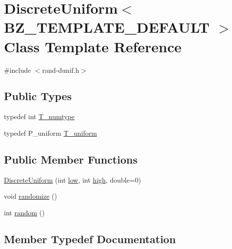 \hypertarget{classDiscreteUniform}{}\section{Discrete\+Uniform$<$ B\+Z\+\_\+\+T\+E\+M\+P\+L\+A\+T\+E\+\_\+\+D\+E\+F\+A\+U\+L\+T $>$ Class Template Reference}
\label{classDiscreteUniform}


{\ttfamily \#include $<$rand-\/dunif.\+h$>$}

\subsection*{Public Types}
\begin{DoxyCompactItemize}
\item 
typedef int \hyperlink{classDiscreteUniform_aaffd818479c69c4d6f9fa047b85481a4}{T\+\_\+numtype}
\item 
typedef P\+\_\+uniform \hyperlink{classDiscreteUniform_aa08e367089d386765d4958f2bef525da}{T\+\_\+uniform}
\end{DoxyCompactItemize}
\subsection*{Public Member Functions}
\begin{DoxyCompactItemize}
\item 
\hyperlink{classDiscreteUniform_a377aa895f26a4b83f0bac748832dbb04}{Discrete\+Uniform} (int \hyperlink{constants_8h_a2f13f92cd23d69a695f629d173e191b7}{low}, int \hyperlink{constants_8h_ae74c9011680d5f172ff82efa9c482283}{high}, double=0)
\item 
void \hyperlink{classDiscreteUniform_a8f4446c966170fc7b188b9180ab3841d}{randomize} ()
\item 
int \hyperlink{classDiscreteUniform_a604881ece5d5d6f2a741866ede60c71b}{random} ()
\end{DoxyCompactItemize}


\subsection{Member Typedef Documentation}
\hypertarget{classDiscreteUniform_aaffd818479c69c4d6f9fa047b85481a4}{}
